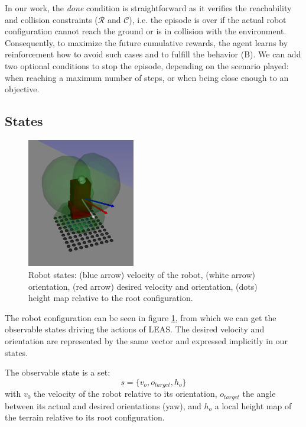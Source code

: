 In our work, the \textit{done} condition is straightforward as it verifies the reachability and collision constraints ($\mathcal{R}$ and $\mathcal{C}$), i.e. the episode is over if the actual robot configuration cannot reach the ground or is in collision with the environment. 
Consequently, to maximize the future cumulative rewards, the agent learns by reinforcement how to avoid such cases and to fulfill the behavior (B). 
We can add two optional conditions to stop the episode, depending on the scenario played: when reaching a maximum number of steps, or when being close enough to an objective.





\subsection{States\label{subsubsec:states}}

\begin{figure}
    \centering
    \includegraphics[width=0.42\textwidth]{Figures/Chapter_LEAS/leas_states.png}
    \caption{Robot states: (blue arrow) velocity of the robot, (white arrow) orientation, (red arrow) desired velocity and orientation, (dots) height map relative to the root configuration.}
    \label{fig:LEAS_states}
\end{figure}

The robot configuration can be seen in figure \ref{fig:LEAS_states}, from which we can get the observable states driving the actions of LEAS. The desired velocity and orientation are represented by the same vector and expressed implicitly in our states.

The observable state is a set: 
\begin{equation}
s=\{v_{o}, o_{target}, h_{o}\}
\end{equation}
with $v_{0}$ the velocity of the robot relative to its orientation, $o_{target}$ the angle between its actual and desired orientations (yaw), and $h_{o}$ a local height map of the terrain relative to its root configuration.


